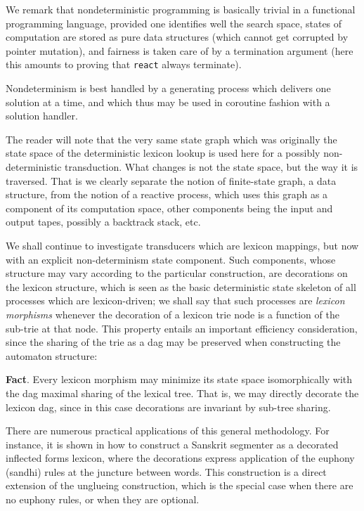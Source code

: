 We remark that nondeterministic programming is basically
trivial in a functional programming language, provided one identifies well
the search space, states of computation are stored as pure data structures
(which cannot get corrupted by pointer mutation),
and fairness is taken care of by a termination argument 
(here this amounts to proving that \verb:react: always terminate).

Nondeterminism is best handled by a generating process which delivers
one solution at a time, and which thus may be used in coroutine fashion with
a solution handler. 

The reader will note that the very same state graph which was originally the
state space of the deterministic lexicon lookup is used here for a possibly
non-deterministic transduction. What changes is not the state space, but
the way it is traversed. That is we clearly separate the notion of 
finite-state graph, a data structure, from the notion of a reactive process,
which uses this graph as a component of its computation space, other components
being the input and output tapes, possibly a backtrack stack, etc.

We shall continue to investigate transducers which are lexicon mappings,
but now with an explicit non-determinism state component. Such components,
whose structure may vary according to the particular construction, are
decorations on the lexicon structure, which is seen as the basic
deterministic state skeleton of all processes which are
lexicon-driven; we shall say that such processes are
{\sl lexicon morphisms} whenever the decoration of a lexicon trie node is a 
function of the sub-trie at that node. 
This property entails an important
efficiency consideration, since the sharing of the trie as a dag may be 
preserved when constructing the automaton structure:

\noindent
{\bf Fact}. Every lexicon morphism may minimize its state space isomorphically
with the dag maximal sharing of the lexical tree. That is, we may directly 
decorate the lexicon dag, since in this case
decorations are invariant by sub-tree sharing.

There are numerous practical applications of this general methodology.
For instance, it is shown in \cite{2004-Huet-1} how to construct 
a Sanskrit segmenter as a
decorated inflected forms lexicon, where the decorations express application
of the euphony (sandhi) rules at the juncture between words. 
This construction is a
direct extension of the unglueing construction, which is the special case
when there are no euphony rules, or when they are optional. 

